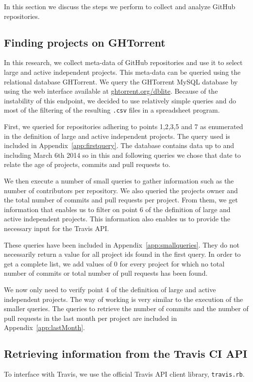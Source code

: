 In this section we discuss the steps we perform to collect and analyze GitHub repositories.

\subsection{Finding projects on GHTorrent}
In this research, we collect meta-data of GitHub repositories and use it to select large and active independent projects.
This meta-data can be queried using the relational database GHTorrent. \cite{ghtorrent}
We query the GHTorrent MySQL database by using the web interface available at \url{ghtorrent.org/dblite}. 
Because of the instability of this endpoint, we decided to use relatively simple queries and do most of the filtering of the resulting \texttt{.csv} files in a spreadsheet program.

First, we queried for repositories adhering to points 1,2,3,5 and 7 as enumerated in the definition of large and active independent projects.
The query used is included in Appendix~\ref{app:firstquery}.
The database contains data up to and including March 6th 2014 so in this and following queries we chose that date to relate the age of projects, commits and pull requests to.

We then execute a number of small queries to gather information such as the number of contributors per repository. 
We also queried the projects owner and the total number of commits and pull requests per project. 
From them, we get information that enables us to filter on point 6 of the definition of large and active independent projects. 
This information also enables us to provide the necessary input for the Travis API.

These queries have been included in Appendix~\ref{app:smallqueries}.
They do not necessarily return a value for all project ids found in the first query.
In order to get a complete list, we add values of 0 for every project for which no total number of commits or total number of pull requests has been found.

We now only need to verify point 4 of the definition of large and active independent projects. 
The way of working is very similar to the execution of the smaller queries. 
The queries to retrieve the number of commits and the number of pull requests in the last month per project are included in Appendix~\ref{app:lastMonth}.

\subsection{Retrieving information from the Travis CI API}
To interface with Travis, we use the official Travis API client library, \texttt{travis.rb}.

